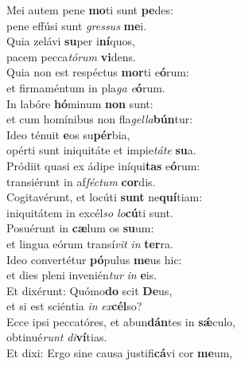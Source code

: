 \evenverse Mei autem pene \textbf{mo}ti sunt \textbf{pe}des:~\*\\
\evenverse pene effúsi sunt \textit{gres}\textit{sus} \textbf{me}i.\\
\oddverse Quia zelávi \textbf{su}per i\textbf{ní}quos,~\*\\
\oddverse pacem pecca\textit{tó}\textit{rum} \textbf{vi}dens.\\
\evenverse Quia non est respéctus \textbf{mor}ti e\textbf{ó}rum:~\*\\
\evenverse et firmaméntum in pla\textit{ga} \textit{e}\textbf{ó}rum.\\
\oddverse In labóre \textbf{hó}minum \textbf{non} sunt:~\*\\
\oddverse et cum homínibus non fla\textit{gel}\textit{la}\textbf{bún}tur:\\
\evenverse Ideo ténuit \textbf{e}os su\textbf{pér}bia,~\*\\
\evenverse opérti sunt iniquitáte et impie\textit{tá}\textit{te} \textbf{su}a.\\
\oddverse Pródiit quasi ex ádipe iníqui\textbf{tas} e\textbf{ó}rum:~\*\\
\oddverse transiérunt in af\textit{fé}\textit{ctum} \textbf{cor}dis.\\
\evenverse Cogitavérunt, et locúti \textbf{sunt} ne\textbf{quí}tiam:~\*\\
\evenverse iniquitátem in excél\textit{so} \textit{lo}\textbf{cú}ti sunt.\\
\oddverse Posuérunt in \textbf{cæ}lum os \textbf{su}um:~\*\\
\oddverse et lingua eórum transí\textit{vit} \textit{in} \textbf{ter}ra.\\
\evenverse Ideo convertétur \textbf{pó}pulus \textbf{me}us hic:~\*\\
\evenverse et dies pleni invenién\textit{tur} \textit{in} \textbf{e}is.\\
\oddverse Et dixérunt: Quómo\textbf{do} scit \textbf{De}us,~\*\\
\oddverse et si est sciéntia \textit{in} \textit{ex}\textbf{cél}so?\\
\evenverse Ecce ipsi peccatóres, et abun\textbf{dán}tes in \textbf{sǽ}culo,~\*\\
\evenverse obtinué\textit{runt} \textit{di}\textbf{ví}tias.\\
\oddverse Et dixi: Ergo sine causa justifi\textbf{cá}vi cor \textbf{me}um,~\*\\

